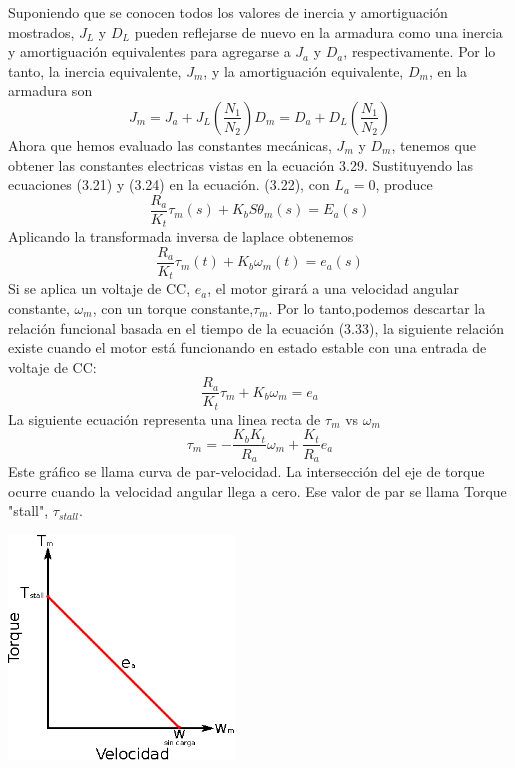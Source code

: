 Suponiendo que se conocen todos los valores de inercia y amortiguación mostrados, $J_L$ y $D_L$ pueden reflejarse de nuevo en la
armadura como una inercia y amortiguación equivalentes para agregarse a $J_a$ y $D_a$, respectivamente. Por lo tanto, la inercia
equivalente, $J_m$, y la amortiguación equivalente, $D_m$, en la armadura son
\begin{subequations}
	\begin{equation}
		J_m = J_a + J_L \left( \frac{N_1}{N_2} \right)
	\end{equation}
	\begin{equation}
		D_m = D_a + D_L\left( \frac{N_1}{N_2} \right)
	\end{equation}
\end{subequations}
Ahora que hemos evaluado las constantes mecánicas, $J_m$ y $D_m$, tenemos que obtener las constantes electricas vistas en la
ecuación 3.29. Sustituyendo las ecuaciones (3.21) y (3.24) en la ecuación. (3.22), con $L_a = 0$, produce
\begin{equation}
	\frac{R_a}{K_t} \tau_m (s) + K_bS\theta_m(s) = E_a(s)
\end{equation}
Aplicando la transformada inversa de laplace obtenemos
\begin{equation}
	\frac{R_a}{K_t} \tau_m (t) + K_b\omega_m(t) = e_a(s)
\end{equation}
Si se aplica un voltaje de CC, $e_a$, el motor girará a una velocidad angular constante, $\omega_m$, con un torque constante,$\tau_m$.
Por lo tanto,podemos descartar la relación funcional basada en el tiempo de la ecuación (3.33), la siguiente relación existe
cuando el motor está funcionando en estado estable con una entrada de voltaje de CC:
\begin{equation}
	\frac{R_a}{K_t} \tau_m + K_b\omega_m = e_a
\end{equation}
La siguiente ecuación representa una linea recta de $\tau_m$ vs $\omega_m$
\begin{equation}
	\tau_m = -\frac{K_bK_t}{R_a} \omega_m + \frac{K_t}{R_a}e_a
\end{equation}
Este gráfico se llama curva de par-velocidad. La intersección del eje de torque ocurre cuando la velocidad angular llega a cero.
Ese valor de par se llama Torque "stall", $\tau_{stall}$.
\begin{center}
	\includegraphics[width=0.45\textwidth]{Contenido/Cuerpo/Capitulo3/Fig19.eps}
	\label{fig:ModeloMat:Fig1}
\end{center}
